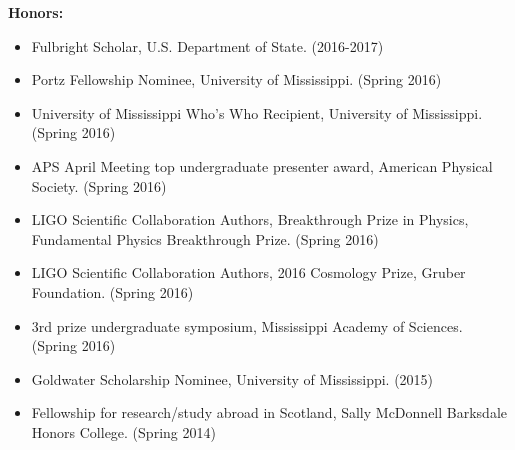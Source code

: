 \documentclass[10pt]{article} %
\begin{document}







\textbf{Honors:}
\begin{itemize}
\item Fulbright Scholar, U.S. Department of State. (2016-2017)
\item Portz Fellowship Nominee, University of Mississippi. (Spring 2016)
\item University of Mississippi Who's Who Recipient, University of Mississippi. (Spring 2016)
\item APS April Meeting top undergraduate presenter award, American Physical Society. (Spring 2016)
\item LIGO Scientific Collaboration Authors, Breakthrough Prize in Physics, Fundamental Physics Breakthrough Prize. (Spring 2016)
\item LIGO Scientific Collaboration Authors, 2016 Cosmology Prize, Gruber Foundation. (Spring 2016)
\item 3rd prize undergraduate symposium, Mississippi Academy of Sciences. (Spring 2016)
\item Goldwater Scholarship Nominee, University of Mississippi. (2015)
\item Fellowship for research/study abroad in Scotland, Sally McDonnell Barksdale Honors College. (Spring 2014)
\end{itemize}
\end{document}
